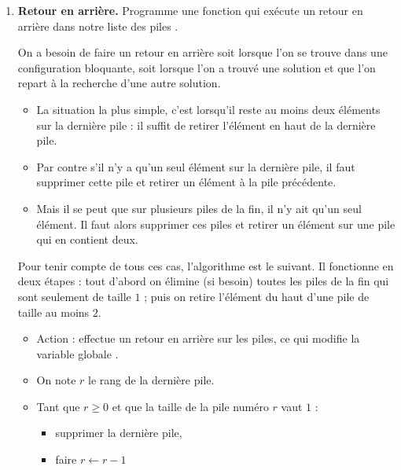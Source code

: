\documentclass[11pt,class=report,crop=false]{standalone}
\begin{document}
\begin{activite}
\begin{enumerate}
  \item \textbf{Retour en arrière.}
  Programme une fonction  qui exécute un retour en arrière dans notre liste des piles .
  
  On a besoin de faire un retour en arrière soit lorsque l'on se trouve dans une configuration bloquante, soit lorsque l'on a trouvé une solution et que l'on repart à la recherche d'une autre solution.

\begin{itemize}
  \item La situation la plus simple, c'est lorsqu'il reste au moins deux éléments sur la dernière pile : il suffit de retirer l'élément en haut de la dernière pile.
  
  \medskip
  

  
  \item Par contre s'il n'y a qu'un seul élément sur la dernière pile, il faut supprimer cette pile et retirer un élément à la pile précédente.
  
  \medskip  
  
  
  
  \item Mais il se peut que sur plusieurs piles de la fin, il n'y ait qu'un seul élément. Il faut alors supprimer ces piles et retirer un élément sur une pile qui en contient deux.
  
    \medskip
  

  \end{itemize} 
  
  Pour tenir compte de tous ces cas, l'algorithme est le suivant. Il fonctionne en deux étapes : tout d'abord on élimine (si besoin) toutes les piles de la fin qui sont seulement de taille $1$ ; puis on retire l'élément du haut d'une pile de taille au moins $2$. 
  
  \begin{algorithme}
  \sauteligne 
 \begin{itemize}
   \item Action : effectue un retour en arrière sur les piles, ce qui modifie  la variable globale .
  
  \item On note $r$ le rang de la dernière pile.
  
  \item Tant que $r \ge 0$ et que la taille de la pile numéro $r$ vaut $1$ :
   \begin{itemize}
     \item supprimer la dernière pile,
     \item faire $r \leftarrow r-1$
     \end{itemize}   
     

\end{itemize}
\end{algorithme}
\end{enumerate}
\end{activite}
\end{document}
